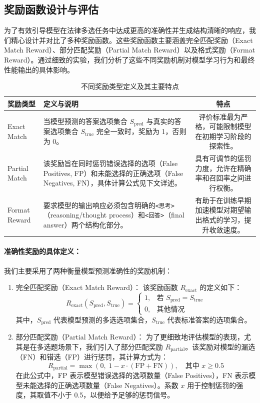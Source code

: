 \documentclass{article}
\begin{document}
\subsection{奖励函数设计与评估}
\label{sec:reward_design_experimental}
为了有效引导模型在法律多选任务中达成更高的准确性并生成结构清晰的响应，我们精心设计并对比了多种奖励函数。这些奖励函数主要涵盖完全匹配奖励（Exact Match Reward）、部分匹配奖励（Partial Match Reward）以及格式奖励（Format Reward）。通过细致的实验，我们分析了这些不同奖励机制对模型学习行为和最终性能输出的具体影响。

\begin{table}[h]
\centering
\caption{不同奖励类型定义及其主要特点}
\begin{tabular}{l|p{8cm}|c}
\hline
奖励类型 & 定义与说明 & 特点 \\
\hline
Exact Match & 当模型预测的答案选项集合 $S_{\text{pred}}$ 与真实的答案选项集合 $S_{\text{true}}$ 完全一致时，奖励为 1，否则为 0。 & 评价标准最为严格，可能限制模型在初期学习阶段的探索性。 \\
Partial Match & 该奖励旨在同时惩罚错误选择的选项（False Positives, FP）和未能选择的正确选项（False Negatives, FN），具体计算公式见下文详述。 & 具有可调节的惩罚力度，允许在精确率和召回率之间进行权衡。 \\
Format Reward & 要求模型的输出响应必须包含明确的\texttt{<思考>}（reasoning/thought process）和\texttt{<回答>}（final answer）两个结构化部分。 & 有助于在训练早期加速模型对期望输出格式的学习，提升收敛速度。 \\
\hline
\end{tabular}
\label{tab:reward_types_definition}
\end{table}

\paragraph{准确性奖励的具体定义：}
我们主要采用了两种衡量模型预测准确性的奖励机制：

\begin{enumerate}[label=(\arabic*)]
    \item 完全匹配奖励（Exact Match Reward）：
    该奖励函数 $R_{\mathrm{exact}}$ 的定义如下：
    $$R_{\mathrm{exact}}(S_{\mathrm{pred}}, S_{\mathrm{true}}) = \begin{cases} 1, & \text{若 } S_{\mathrm{pred}} = S_{\mathrm{true}} \\ 0, & \text{其他情况} \end{cases}$$
    其中，$S_{\mathrm{pred}}$ 代表模型预测的多选选项集合，$S_{\mathrm{true}}$ 代表标准答案的选项集合。

    \item 部分匹配奖励（Partial Match Reward）：
    为了更细致地评估模型的表现，尤其是在多选题场景下，我们引入了部分匹配奖励 $R_{\mathrm{partial}}$。该奖励对模型的漏选（FN）和错选（FP）进行惩罚，其计算方式为：
    $$R_{\mathrm{partial}} = \max\left(0,\;1 - x \cdot (\mathrm{FP} + \mathrm{FN})\right),\quad \text{其中 } x \ge 0.5$$
    在此公式中，FP 表示模型错误选择的选项数量（False Positives），FN 表示模型未能选择的正确选项数量（False Negatives）。系数 $x$ 用于控制惩罚的强度，其取值不小于 0.5，以便给予足够的惩罚信号。
\end{enumerate}
\end{document}
